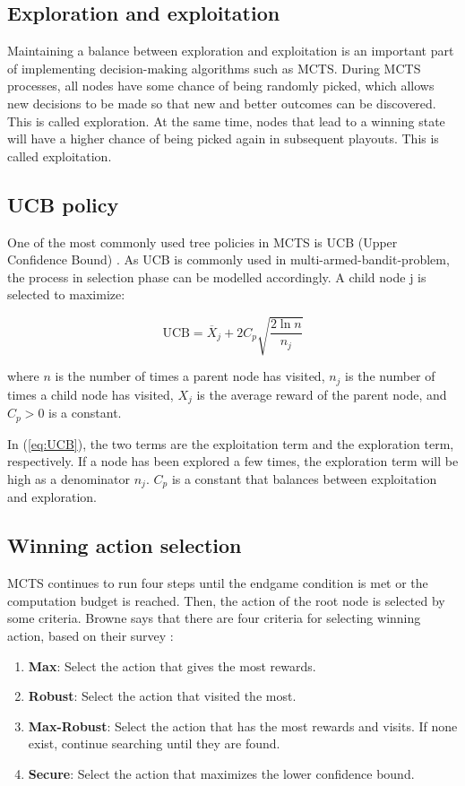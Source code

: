 \subsection{Exploration and exploitation}
Maintaining a balance between exploration and exploitation is an important part of implementing decision-making algorithms such as MCTS. During MCTS processes, all nodes have some chance of being randomly picked, which allows new decisions to be made so that new and better outcomes can be discovered. This is called exploration. At the same time, nodes that lead to a winning state will have a higher chance of being picked again in subsequent \glspl{playout}. This is called exploitation.

\subsection{UCB policy}
One of the most commonly used tree policies in MCTS is UCB (Upper Confidence Bound) \cite{RN2020}. As UCB is commonly used in \gls{multi-armed-bandit-problem}, the process in selection phase can be modelled accordingly. A child node j is selected to maximize:

\begin{equation}
  \label{eq:UCB}
  \mathrm{UCB} = \overline{X}_j + 2C_p\sqrt{\frac{2\ln n}{n_j}} 
\end{equation}

where $n$ is the number of times a parent node has visited, $n_j$ is the number of times a child node has visited, $X_j$ is the average reward of the parent node, and $C_p > 0$ is a constant.

In (\ref{eq:UCB}), the two terms are the exploitation term and the exploration term, respectively. If a node has been explored a few times, the exploration term will be high as a denominator $n_j$. $C_p$ is a constant that balances between exploitation and exploration.

\subsection{Winning action selection} \label{winning-action}
MCTS continues to run four steps until the endgame condition is met or the computation budget is reached. Then, the action of the root node is selected by some criteria. \newline Browne says that there are four criteria for selecting winning action, based on their survey \cite{mcts-survey}:

\begin{enumerate}
  \item \textbf{Max}: Select the action that gives the most rewards.
  \item \textbf{Robust}: Select the action that visited the most. 
  \item \textbf{Max-Robust}: Select the action that has the most rewards and visits. If none exist, continue searching until they are found.
  \item \textbf{Secure}: Select the action that maximizes the lower confidence bound.
\end{enumerate}

